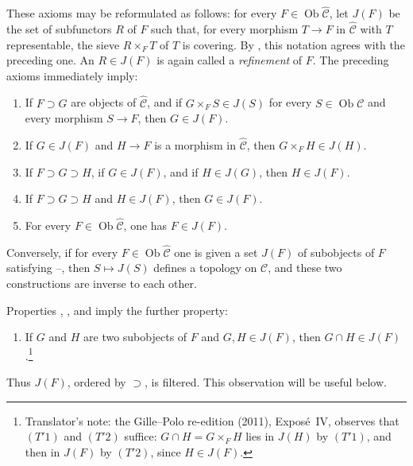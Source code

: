These axioms may be reformulated as follows: for every
\(F\in\operatorname{Ob}\widehat{\mathscr C}\), let \(J(F)\) be the set of
subfunctors \(R\) of \(F\) such that, for every morphism \(T\to F\) in
\(\widehat{\mathscr C}\) with \(T\) representable, the sieve
\(R\times_FT\) of \(T\) is covering. By , this notation agrees with
the preceding one. An \(R\in J(F)\) is again called a \emph{refinement} of
\(F\). The preceding axioms immediately imply:
\begin{enumerate}
 \item[\((T'0)\)] If \(F\supset G\) are objects of
 \(\widehat{\mathscr C}\), and if
 \(G\times_FS\in J(S)\) for every \(S\in\operatorname{Ob}\mathscr C\) and
 every morphism \(S\to F\), then \(G\in J(F)\).
 \item[\((T'1)\)] If \(G\in J(F)\) and \(H\to F\) is a morphism in
 \(\widehat{\mathscr C}\), then \(G\times_FH\in J(H)\).
 \item[\((T'2)\)] If \(F\supset G\supset H\), if \(G\in J(F)\),
 and if \(H\in J(G)\), then \(H\in J(F)\).
 \item[\((T'3)\)] If \(F\supset G\supset H\) and \(H\in J(F)\),
 then \(G\in J(F)\).
 \item[\((T'4)\)] For every
 \(F\in\operatorname{Ob}\widehat{\mathscr C}\), one has \(F\in J(F)\).
\end{enumerate}
Conversely, if for every \(F\in\operatorname{Ob}\widehat{\mathscr C}\)
one is given a set \(J(F)\) of subobjects of \(F\) satisfying
--, then \(S\mapsto J(S)\) defines a topology on
\(\mathscr C\), and these two constructions are inverse to each other.

Properties , , and  imply the further
property:
\begin{enumerate}
 \item[\((T'5)\)] If \(G\) and \(H\) are two subobjects of \(F\) and
 \(G,H\in J(F)\), then \(G\cap H\in J(F)\).\footnote{Translator's note: the Gille--Polo re-edition (2011), Expos\'e~IV, observes
that \((T'1)\) and \((T'2)\) suffice: \(G\cap H=G\times_FH\) lies in \(J(H)\)
by \((T'1)\), and then in \(J(F)\) by \((T'2)\), since \(H\in J(F)\).}
\end{enumerate}
Thus \(J(F)\), ordered by \(\supset\), is filtered. This observation will
be useful below.

